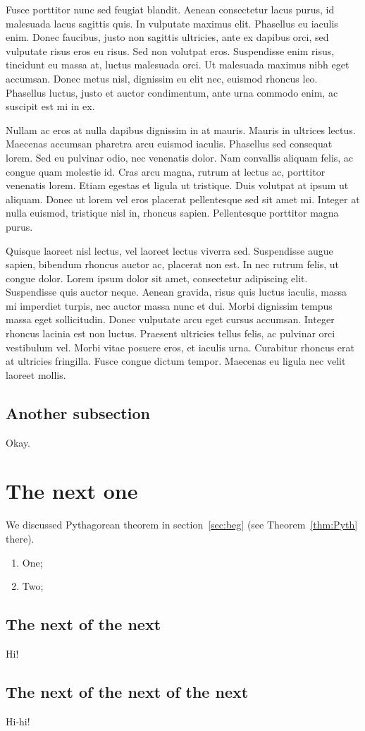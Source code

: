 \documentclass[notitlepage]{article}
\begin{document}
Fusce porttitor nunc sed feugiat blandit. Aenean consectetur lacus purus, id malesuada lacus sagittis quis. In vulputate maximus elit. Phasellus eu iaculis enim. Donec faucibus, justo non sagittis ultricies, ante ex dapibus orci, sed vulputate risus eros eu risus. Sed non volutpat eros. Suspendisse enim risus, tincidunt eu massa at, luctus malesuada orci. Ut malesuada maximus nibh eget accumsan. Donec metus nisl, dignissim eu elit nec, euismod rhoncus leo. Phasellus luctus, justo et auctor condimentum, ante urna commodo enim, ac suscipit est mi in ex.

Nullam ac eros at nulla dapibus dignissim in at mauris. Mauris in ultrices lectus. Maecenas accumsan pharetra arcu euismod iaculis. Phasellus sed consequat lorem. Sed eu pulvinar odio, nec venenatis dolor. Nam convallis aliquam felis, ac congue quam molestie id. Cras arcu magna, rutrum at lectus ac, porttitor venenatis lorem. Etiam egestas et ligula ut tristique. Duis volutpat at ipsum ut aliquam. Donec ut lorem vel eros placerat pellentesque sed sit amet mi. Integer at nulla euismod, tristique nisl in, rhoncus sapien. Pellentesque porttitor magna purus.

Quisque laoreet nisl lectus, vel laoreet lectus viverra sed. Suspendisse augue sapien, bibendum rhoncus auctor ac, placerat non est. In nec rutrum felis, ut congue dolor. Lorem ipsum dolor sit amet, consectetur adipiscing elit. Suspendisse quis auctor neque. Aenean gravida, risus quis luctus iaculis, massa mi imperdiet turpis, nec auctor massa nunc et dui. Morbi dignissim tempus massa eget sollicitudin. Donec vulputate arcu eget cursus accumsan. Integer rhoncus lacinia est non luctus. Praesent ultricies tellus felis, ac pulvinar orci vestibulum vel. Morbi vitae posuere eros, et iaculis urna. Curabitur rhoncus erat at ultricies fringilla. Fusce congue dictum tempor. Maecenas eu ligula nec velit laoreet mollis. 
        \subsection{Another subsection}
        Okay.

    \section{The next one}
        We discussed Pythagorean theorem in section~\ref{sec:beg} (see
        Theorem~\ref{thm:Pyth} there).
        \begin{enumerate}
            \item One;
            \item Two;
        \end{enumerate}
        \subsection{The next of the next}
        Hi!
        \subsection{The next of the next of the next}
        Hi-hi!
\end{document}
